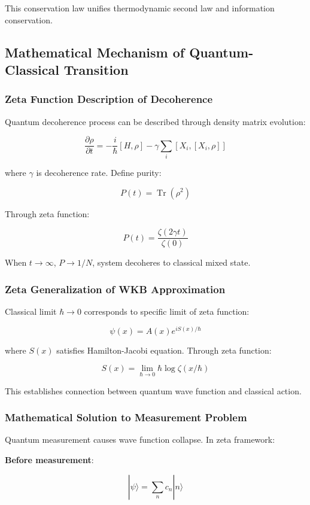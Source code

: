 \documentclass[12pt,a4paper]{article}
\DeclareMathOperator{\Tr}{Tr}
\begin{document}
This conservation law unifies thermodynamic second law and information conservation.

\subsection{Mathematical Mechanism of Quantum-Classical Transition}

\subsubsection{Zeta Function Description of Decoherence}

Quantum decoherence process can be described through density matrix evolution:

$$\frac{\partial \rho}{\partial t} = -\frac{i}{\hbar}[H, \rho] - \gamma \sum_i [X_i, [X_i, \rho]]$$

where $\gamma$ is decoherence rate. Define purity:

$$P(t) = \Tr(\rho^2)$$

Through zeta function:

$$P(t) = \frac{\zeta(2\gamma t)}{\zeta(0)}$$

When $t \to \infty$, $P \to 1/N$, system decoheres to classical mixed state.

\subsubsection{Zeta Generalization of WKB Approximation}

Classical limit $\hbar \to 0$ corresponds to specific limit of zeta function:

$$\psi(x) = A(x) e^{iS(x)/\hbar}$$

where $S(x)$ satisfies Hamilton-Jacobi equation. Through zeta function:

$$S(x) = \lim_{\hbar \to 0} \hbar \log \zeta(x/\hbar)$$

This establishes connection between quantum wave function and classical action.

\subsubsection{Mathematical Solution to Measurement Problem}

Quantum measurement causes wave function collapse. In zeta framework:

\textbf{Before measurement}:

$$|\psi\rangle = \sum_n c_n |n\rangle$$
\end{document}
